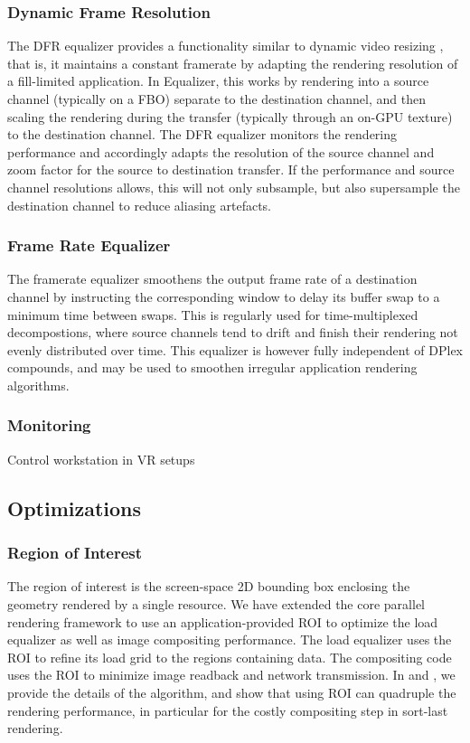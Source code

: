 \documentclass[journal]{vgtc}                %
\begin{document}
\subsubsection{Dynamic Frame Resolution}

The DFR equalizer provides a functionality similar to dynamic video resizing
\cite{MBDM:97}, that is, it maintains a constant framerate by adapting the
rendering resolution of a fill-limited application. In Equalizer, this works by
rendering into a source channel (typically on a FBO) separate to the destination
channel, and then scaling the rendering during the transfer (typically through
an on-GPU texture) to the destination channel. The DFR equalizer monitors the
rendering performance and accordingly adapts the resolution of the source
channel and zoom factor for the source to destination transfer. If the
performance and source channel resolutions allows, this will not only subsample,
but also supersample the destination channel to reduce aliasing artefacts.

\subsubsection{Frame Rate Equalizer}\label{SEC_framerateEq}

The framerate equalizer smoothens the output frame rate of a destination
channel by instructing the corresponding window to delay its buffer swap to a
minimum time between swaps. This is regularly used for time-multiplexed
decompostions, where source channels tend to drift and finish their rendering
not evenly distributed over time. This equalizer is however fully independent of
DPlex compounds, and may be used to smoothen irregular application rendering
algorithms.

\subsubsection{Monitoring}

Control workstation in VR setups

\subsection{Optimizations}

\subsubsection{Region of Interest}

The region of interest is the screen-space 2D bounding box enclosing the
geometry rendered by a single resource. We have extended the core parallel
rendering framework to use an application-provided ROI to optimize the load
equalizer as well as image compositing performance. The load equalizer uses the
ROI to refine its load grid to the regions containing data. The compositing code
uses the ROI to minimize image readback and network transmission. In
\cite{MEP:10} and \cite{EBAHMP:12}, we provide the details of the algorithm, and
show that using ROI can quadruple the rendering performance, in particular for
the costly compositing step in sort-last rendering.
\end{document}
